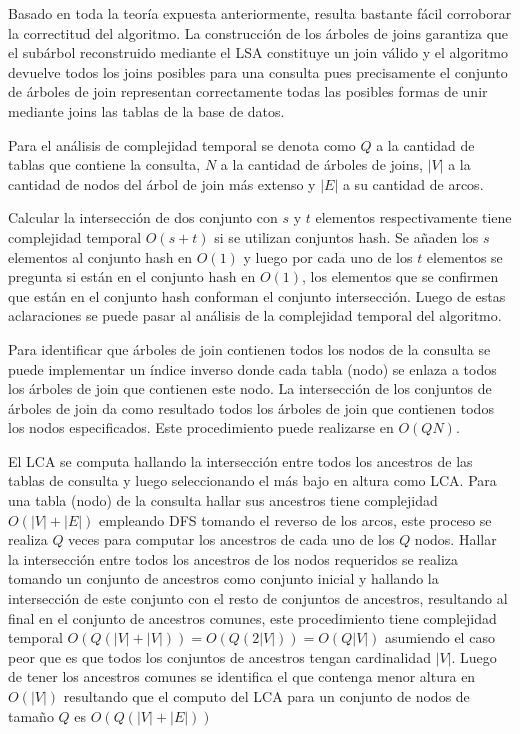 Basado en toda la teoría expuesta anteriormente, resulta bastante fácil corroborar la correctitud del 
algoritmo. La construcción de los \'arboles de joins garantiza que el sub\'arbol reconstruido mediante el 
LSA constituye un join válido y el algoritmo devuelve todos los joins posibles para una consulta pues 
precisamente el conjunto de \'arboles de join representan correctamente todas las posibles formas de 
unir mediante joins las tablas de la base de datos.

Para el análisis de complejidad temporal se denota como $Q$ a la cantidad de tablas que contiene la consulta, 
$N$ a la cantidad de \'arboles de joins, $|V|$ a la cantidad de nodos del \'arbol de join m\'as extenso y $|E|$
a su cantidad de arcos. 

Calcular la intersección de dos conjunto con $s$ y $t$ elementos respectivamente tiene 
complejidad temporal $O(s + t)$ si se utilizan conjuntos hash. Se añaden los $s$ elementos al conjunto hash en $O(1)$
y luego por cada uno de los $t$ elementos se pregunta si est\'an en el conjunto hash en $O(1)$, los elementos 
que se confirmen que est\'an en el conjunto hash conforman el conjunto intersección. Luego de estas aclaraciones 
se puede pasar al análisis de la complejidad temporal del algoritmo.

Para identificar que \'arboles de join contienen todos los nodos de la consulta se puede implementar un índice 
inverso donde cada tabla (nodo) se enlaza a todos los árboles de join que contienen 
este nodo. La intersección de los conjuntos de árboles de join da como resultado todos los árboles de join 
que contienen todos los nodos especificados. Este procedimiento puede realizarse en $O(QN)$. 

El LCA se computa hallando la intersección entre todos los ancestros de las tablas de consulta y luego 
seleccionando el m\'as bajo en altura como LCA. Para una tabla (nodo) de la consulta hallar sus ancestros 
tiene complejidad $O(|V| + |E|)$ empleando DFS tomando el reverso de los arcos, este proceso se realiza $Q$ veces
para computar los ancestros de cada uno de los $Q$ nodos. 
Hallar la intersección 
entre todos los ancestros de los nodos requeridos se realiza tomando un conjunto de ancestros 
como conjunto inicial y hallando la intersección de este conjunto con el resto de conjuntos de ancestros, 
resultando al final en el conjunto de ancestros comunes, este procedimiento tiene complejidad temporal 
$O(Q(|V| + |V|)) = O(Q(2|V|)) = O(Q|V|)$ asumiendo el caso peor que es que todos los conjuntos de ancestros 
tengan cardinalidad $|V|$. Luego de tener los ancestros comunes se identifica el que contenga menor altura 
en $O(|V|)$ resultando que el computo del LCA para un conjunto de nodos de tamaño $Q$ es $O(Q(|V| + |E|))$

